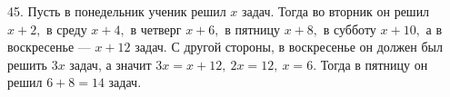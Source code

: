 45. Пусть в понедельник ученик решил $x$ задач. Тогда во вторник он решил $x+2,$ в среду $x+4,$ в четверг $x+6,$ в пятницу $x+8,$ в субботу $x+10,$ а в воскресенье --- $x+12$ задач. С другой стороны, в воскресенье он должен был решить $3x$ задач, а значит $3x=x+12,\ 2x=12,\ x=6.$ Тогда в пятницу он решил $6+8=14$ задач.\\
